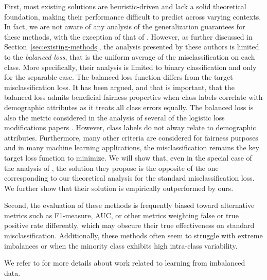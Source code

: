 First, most existing solutions are heuristic-driven and lack a solid
theoretical foundation, making their performance difficult to predict
across varying contexts.  In fact, we are not aware of any analysis of
the generalization guarantees for these methods, with the exception of
that of \cite{cao2019learning}. However, as further discussed in
Section~\ref{sec:existing-methods}, the analysis presented by these
authors is limited to the \emph{balanced loss}, that is the uniform
average of the misclassification on each class.  More specifically,
their analysis is limited to binary classification and only for the
separable case.
%
The balanced loss function differs from the target misclassification
loss. It has been argued, and that is important, that the balanced
loss admits beneficial fairness properties when class labels correlate
with demographic attributes as it treats all class errors equally.
The balanced loss is also the metric considered in the analysis of
several of the logistic loss modifications papers
\citep{cao2019learning,menon2020long,Ye:2020,kini2021label}.
However, class labels do not alway relate to demographic attributes.
Furthermore, many other criteria are considered for fairness purposes
and in many machine learning applications, the misclassification
remains the key target loss function to minimize.  We will show that,
even in the special case of the analysis of \cite{cao2019learning},
the solution they propose is the opposite of the one corresponding to
our theoretical analysis for the standard misclassification loss. We
further show that their solution is empirically outperformed by ours.

Second, the evaluation of these methods is frequently biased toward
alternative metrics such as F1-measure, AUC, or other metrics
weighting false or true positive rate differently, which may obscure
their true effectiveness on standard misclassification.  Additionally,
these methods often seem to struggle with extreme imbalances or when
the minority class exhibits high intra-class variability.

We refer to \citet{ZhangKangHooiYanFeng2023} for more details about
work related to learning from imbalanced data.